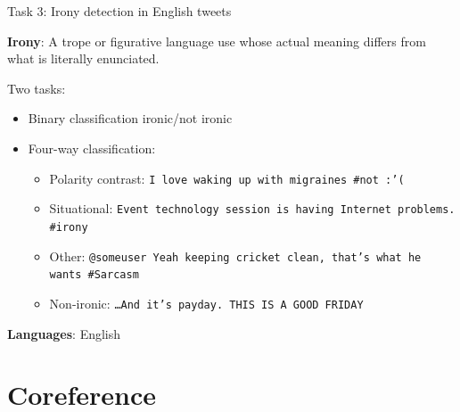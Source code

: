 \documentclass[10pt, compress]{beamer}
\begin{document}



\begin{frame}{Task 3: Irony detection in English tweets}

\textbf{Irony}: A trope or figurative language use whose actual meaning differs from what is literally enunciated.

Two tasks:
\begin{itemize}
  \item Binary classification ironic/not ironic
  \item Four-way classification: 
  \begin{itemize}
     \item Polarity contrast: {\tt I love waking up with migraines \#not :'(}
     \item Situational: {\tt Event technology session is having Internet problems. \#irony}
     \item Other: {\tt @someuser Yeah keeping cricket clean, that's what he wants \#Sarcasm}
     \item Non-ironic: {\tt \ldots And it's payday. THIS IS A GOOD FRIDAY}
  \end{itemize}
\end{itemize}

\textbf{Languages}: English

\end{frame}




\section{Coreference}
\end{document}
